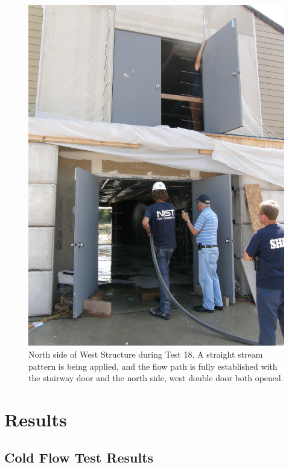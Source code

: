 \documentclass[12pt,oneside]{book}
\begin{document}
\begin{figure}[!ht]
\includegraphics[width=6in]{../Pictures/Test_18}
\caption[North Side of West Structure during Test 18]{North side of West Structure during Test 18. A straight stream pattern is being applied, and the flow path is fully established with the stairway door and the north side, west double door both opened.}
\label{fig:test_18_pic}
\end{figure}
\FloatBarrier

\chapter{Results}
\label{chap:Results}

\section{Cold Flow Test Results}
\label{sec:Cold_Flow_Test_Results}
\end{document}
